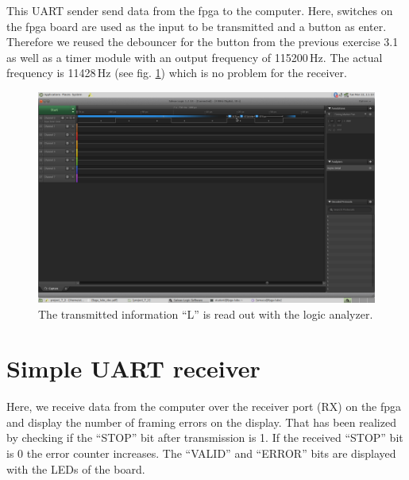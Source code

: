 This UART sender send data from the \gls{fpga} to the computer. Here, switches on the \gls{fpga} board are used as the input to be transmitted and a button as enter. Therefore we reused the debouncer for the button from the previous exercise 3.1 as well as a timer module with an output frequency of 115200\,Hz. The actual frequency is 11428\,Hz (see fig. \ref{fig: transmitted information e_7_2}) which is no problem for the receiver.

\begin{figure}[!htb]
	\centering
	\includegraphics[width=\linewidth]{./L7/E2/freq.png}
	\caption{The transmitted information ``L'' is read out with the logic analyzer. } 
	\label{fig: transmitted information e_7_2}
\end{figure}





\section{Simple UART receiver}

Here, we receive data from the computer over the receiver port (RX) on the \gls{fpga} and display the number of framing errors on the display. That has been realized by checking if the ``STOP'' bit after transmission is 1. If the received ``STOP'' bit is 0 the error counter increases. The ``VALID'' and ``ERROR'' bits are displayed with the LEDs of the board. 





